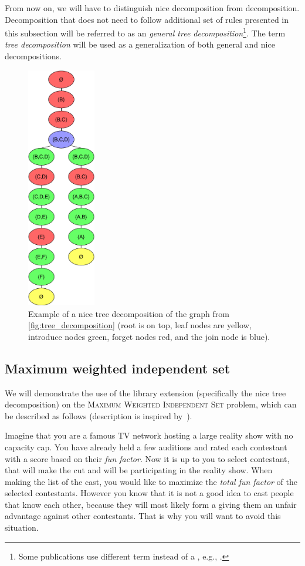 \documentclass[thesis=B,english]{FITthesis}[2019/03/21]
\begin{document}
From now on, we will have to distinguish nice decomposition from  decomposition. Decomposition that does not need to follow additional set of rules presented in this subsection will be referred to as an \emph{general tree decomposition}\footnote{Some publications use different term instead of a , e.g., .}. The term \emph{tree decomposition} will be used as a generalization of both general and nice decompositions.

\begin{figure}[H]
	\centering
 	\includegraphics[width=3cm]{img/nice-graph-decomposition.pdf}
 	\caption[Example of a nice tree decomposition of the graph from  \autoref{fig:tree_decomposition}]{Example of a nice tree decomposition of the graph from  \autoref{fig:tree_decomposition} (root is on top, leaf nodes are yellow, introduce nodes green, forget nodes red, and the join node is blue).}
 	\label{fig:nice_tree_decomposition}
\end{figure}

\subsection{Maximum weighted independent set}
We will demonstrate the use of the library extension (specifically the nice tree decomposition) on the \textsc{Maximum Weighted Independent Set} problem, which can be described as follows (description is inspired by~\cite[Chap. 7.1]{param_algo}).

Imagine that you are a famous TV network hosting a large reality show with no capacity cap. You have already held a few auditions and rated each contestant with a score based on their \emph{fun factor}. Now it is up to you to select contestant, that will make the cut and will be participating in the reality show. When making the list of the cast, you would like to maximize the \emph{total fun factor} of the selected contestants. However you know that it is not a good idea to cast people that know each other, because they will most likely form a  giving them an unfair advantage against other contestants. That is why you will want to avoid this situation.
\end{document}
